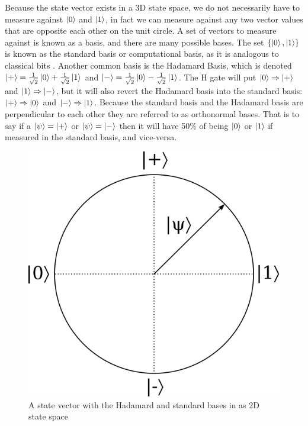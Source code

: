 Because the state vector exists in a 3D state space, we do not necessarily have to measure against $\ket{0}$ and $\ket{1}$, in fact we can measure against any two vector values that are opposite each other on the unit circle. 
A set of vectors to measure against is known as a basis, and there are many possible bases. 
The set $\{\ket{0},\ket{1}\}$ is known as the standard basis or computational basis, as it is analogous to classical bits \cite{qcftgu}.
Another common basis is the Hadamard Basis, which is denoted $\ket{+} = \frac{1}{\sqrt{2}}\ket{0} + \frac{1}{\sqrt{2}}\ket{1}$ and $\ket{-} = \frac{1}{\sqrt{2}}\ket{0} - \frac{1}{\sqrt{2}}\ket{1}$.
The H gate will put $\ket{0} \Rightarrow \ket{+}$ and $\ket{1} \Rightarrow \ket{-}$, but it will also revert the Hadamard basis into the standard basis: $\ket{+} \Rightarrow \ket{0}$ and $\ket{-} \Rightarrow \ket{1}$.
Because the standard basis and the Hadamard basis are perpendicular to each other they are referred to as orthonormal bases.
That is to say if a $\ket{\psi} = \ket{+}$ or $\ket{\psi} = \ket{-}$ then it will have 50\% of being $\ket{0}$ or $\ket{1}$ if measured in the standard basis, and vice-versa. 

\begin{figure}[htp]
\centering
\includegraphics[scale=0.25]{images/orthonormal_basis.png}
\caption{A state vector with the Hadamard and standard bases in as 2D state space}
\label{}
\end{figure}

